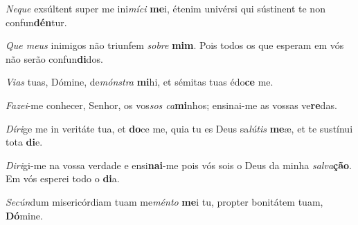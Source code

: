 

\begin{greenumerate}

  \ifbook%
    \setcounter{enumi}{1}
  \else
    \item \textit{Neque} exsúltent super me ini\textit{míci} \textbf{me}i, {\GreStar} étenim univérsi qui sústinent te non confun\textbf{dén}\-tur. 
  \fi

  \switchcolumn%

  \ifbook%
    \setcounter{enumi}{1}
  \else
    \item \textit{Que meus} inimigos não triunfem \textit{sobre} \textbf{mim}. {\GreStar} Pois todos os que esperam em vós não serão confun\textbf{di}dos. 
  \fi

  \switchcolumn*


  \item \textit{Vias} tuas, Dómine, de\textit{mónstra} \textbf{mi}hi, {\GreStar} et sémitas tuas édo\textbf{ce} me. 

  \switchcolumn%

  \item \textit{Fazei}-me conhecer, Senhor, os vos\textit{sos ca}\textbf{mi}\-nhos; {\GreStar} ensinai-me as vossas ve\textbf{re}das. 

  \switchcolumn*


  \item \textit{Díri}ge me in veritáte tua, et \textbf{do}ce me, {\GreDagger} quia tu es Deus sa\textit{lútis} \textbf{me}æ, {\GreStar} et te sustínui tota \textbf{di}e. 

  \switchcolumn%

  \item \textit{Diri}gi-me na vossa verdade e ensi\textbf{nai}-me {\GreDagger} pois vós sois o Deus da minha \textit{salva}\textbf{ção}. {\GreStar} Em vós esperei todo o \textbf{di}a. 

  \switchcolumn*


  \item \textit{Secún}dum misericórdiam tuam me\textit{ménto} \textbf{me}\-i tu, {\GreStar} propter bonitátem tuam, \textbf{Dó}mine. 


\end{greenumerate}
